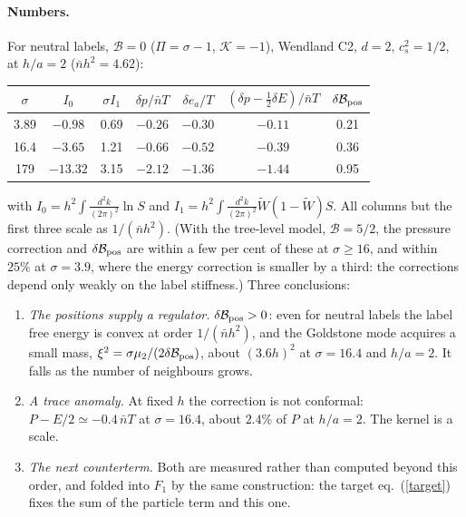 \documentclass[11pt,aps,preprint,nofootinbib,superscriptaddress,tightenlines]{revtex4-2}
\newcommand{\klab}{\mathcal B}
\def\Eq#1{eq.~(\ref{#1})}
\let\oldparagraph\paragraph
\renewcommand{\paragraph}{\par\bigskip\oldparagraph}
\begin{document}
\paragraph{Numbers.}  For neutral labels, $\klab=0$ ($\Pi=\sigma-1$, $\mathcal K=-1$), Wendland C2, $d=2$, $c_s^2=1/2$, at $h/a=2$ ($\bar nh^2=4.62$):
\begin{center}
\begin{tabular}{ccccccc}
\toprule
$\sigma$ & $I_0$ & $\sigma I_1$ & $\delta p/\bar nT$ & $\delta e_a/T$ & $(\delta p-\tfrac12\delta E)/\bar nT$ & $\delta\klab_{\rm pos}$ \\
\midrule
3.89 & $-0.98$ & 0.69 & $-0.26$ & $-0.30$ & $-0.11$ & 0.21 \\
16.4 & $-3.65$ & 1.21 & $-0.66$ & $-0.52$ & $-0.39$ & 0.36 \\
179  & $-13.32$ & 3.15 & $-2.12$ & $-1.36$ & $-1.44$ & 0.95 \\
\bottomrule
\end{tabular}
\end{center}
with $I_0=h^2\!\int\!\frac{d^2k}{(2\pi)^2}\ln S$ and $I_1=h^2\!\int\!\frac{d^2k}{(2\pi)^2}\widetilde W(1-\widetilde W)S$.  All columns but the first three scale as
$1/(\bar nh^2)$.  (With the tree-level model, $\klab=5/2$, the pressure correction and $\delta\klab_{\rm pos}$ are within a few per cent of these at $\sigma\ge16$, and within $25\%$ at $\sigma=3.9$, where the energy correction is smaller by a third: the corrections depend only weakly on the label stiffness.)  Three conclusions:
\begin{enumerate}
\item \emph{The positions supply a regulator.}  $\delta\klab_{\rm pos}>0$: even for neutral labels the label free energy is convex at order $1/(\bar nh^2)$, and the Goldstone mode
  acquires a small mass, $\xi^2=\sigma\mu_2/(2\delta\klab_{\rm pos})$, about $(3.6h)^2$ at $\sigma=16.4$ and $h/a=2$.  It falls as the number of neighbours grows.
\item \emph{A trace anomaly.}  At fixed $h$ the correction is not conformal: $P-E/2\simeq-0.4\,\bar nT$ at $\sigma=16.4$, about $2.4\%$ of $P$ at $h/a=2$.  The kernel
  is a scale.
\item \emph{The next counterterm.}  Both are measured rather than computed beyond this order, and folded into $F_1$ by the same construction: the target \Eq{target}
  fixes the sum of the particle term and this one.
\end{enumerate}

\end{document}
